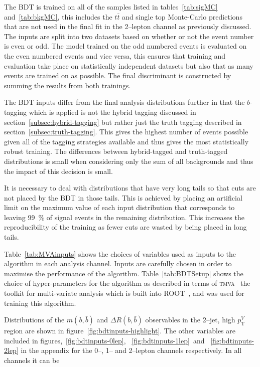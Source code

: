 The BDT is trained on all of the samples listed in tables~\ref{tab:sigMC}
and~\ref{tab:bkgMC}, this includes the $t\bar{t}$ and single top Monte-Carlo
predictions that are not used in the final fit in the 2--lepton channel as
previously discussed. The inputs are split into two datasets based on whether or
not the event number is even or odd. The model trained on the odd numbered
events is evaluated on the even numbered events and vice versa, this ensures
that training and evaluation take place on statistically independent datasets
but also that as many events are trained on as possible. The final discriminant
is constructed by summing the results from both trainings.

The BDT inputs differ from the final analysis distributions further in that the
$b$-tagging which is applied is not the hybrid tagging discussed in
section~\ref{subsec:hybrid-tagging} but rather just the truth tagging described
in section~\ref{subsec:truth-tagging}. This gives the highest number of events
possible given all of the tagging strategies available and thus gives the most
statistically robust training. The differences between hybrid-tagged and
truth-tagged distributions is small when considering only the sum of all
backgrounds and thus the impact of this decision is small.

It is necessary to deal with distributions that have very long tails so that
cuts are not placed by the BDT in those tails. This is achieved by placing an
artificial limit on the maximum value of each input distribution that
corresponds to leaving 99~\% of signal events in the remaining distribution.
This increases the reproducibility of the training as fewer cuts are wasted by
being placed in long tails.

Table~\ref{tab:MVAinputs} shows the choices of variables used as inputs to the
algorithm in each analysis channel. Inputs are carefully chosen in order to
maximise the performance of the algorithm.
 Table~\ref{tab:BDTSetup} shows the
choice of hyper-parameters for the algorithm as described in terms of
\textsc{tmva}~\cite{TMVA} the toolkit for multi-variate analysis which is built
into \textsc{ROOT}~\cite{ROOT}, and was used for training this algorithm.


Distributions of the $m(b,\bar{b})$ and $\Delta R (b, \bar{b})$ observables in
the 2--jet, high $p_{\mathrm{T}}^V$ region are shown in
figure~\ref{fig:bdtinputs-highlight}. The other variables are included in
figures,~\ref{fig:bdtinputs-0lep}, ~\ref{fig:bdtinputs-1lep}~and
~\ref{fig:bdtinputs-2lep} in the appendix for the 0--, 1-- and 2--lepton
channels respectively. In all channels it can be

